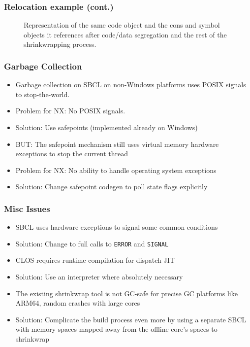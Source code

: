 \documentclass[14pt,t,aspectratio=169]{beamer}
\begin{document}
\begin{frame}
  \frametitle{Relocation example (cont.)}
  \begin{figure}[h]
    \centering
    
    \caption{Representation of the same code object and the cons and
      symbol objects it references after code/data segregation and the
      rest of the shrinkwrapping process.}
    \label{fig:after-shrinkwrap}
  \end{figure}
\end{frame}

\begin{frame}
  \frametitle{Garbage Collection}
  \begin{itemize}
  \item Garbage collection on SBCL on non-Windows platforms uses POSIX
    signals to stop-the-world.
  \item \Rightarrow{} Problem for NX: No POSIX signals.
  \item Solution: Use safepoints (implemented already on Windows)
  \item BUT: The safepoint mechanism still uses virtual memory
    hardware exceptions to stop the current thread
  \item \Rightarrow{} Problem for NX: No ability to handle operating system
    exceptions
  \item Solution: Change safepoint codegen to poll state flags
    explicitly
  \end{itemize}
\end{frame}

\begin{frame}
  \frametitle{Misc Issues}
  \begin{itemize}
  \item SBCL uses hardware exceptions to signal some common conditions
  \item \Rightarrow{} Solution: Change to full calls to \texttt{ERROR} and \texttt{SIGNAL}
  \item CLOS requires runtime compilation for dispatch JIT
  \item \Rightarrow{} Solution: Use an interpreter where absolutely necessary
  \item The existing shrinkwrap tool is not GC-safe for precise GC
    platforms like ARM64, random crashes with large cores
  \item  \Rightarrow{} Solution: Complicate the build process even more by using
    a separate SBCL with memory spaces mapped away from the offline
    core's spaces to shrinkwrap
  \end{itemize}
\end{frame}
\end{document}
